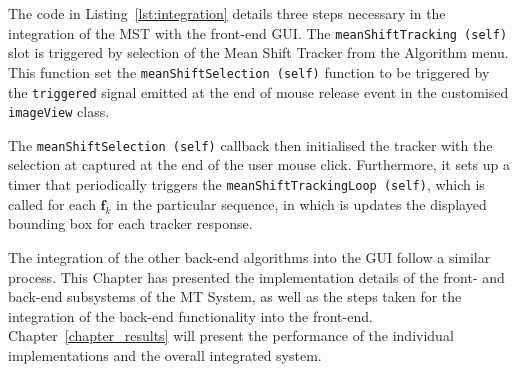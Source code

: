 The code in Listing~\ref{lst:integration} details three steps necessary in the
integration of the MST with the front-end GUI\@. The
\lstinline{meanShiftTracking (self)} slot is triggered by selection of the Mean
Shift Tracker from the Algorithm menu. This function set the
\lstinline{meanShiftSelection (self)} function to be triggered by the 
\lstinline{triggered} signal emitted at the end of mouse
release event in the customised \lstinline{imageView} class. 

The \lstinline{meanShiftSelection (self)} callback then initialised the tracker with
the selection at captured at the end of the user mouse click. Furthermore, it
sets up a timer that periodically triggers the
\lstinline{meanShiftTrackingLoop (self)}, which is called for each
$\mathbf{f}_k$ in the particular sequence, in which is updates the displayed
bounding box for each tracker response.

The integration of the other back-end algorithms into the GUI follow a similar
process.
This Chapter has presented the implementation details of the front- and back-end
subsystems of the MT System, as well as the steps taken for the integration of
the back-end functionality into the front-end.
Chapter~\ref{chapter_results} will present the performance of the individual
implementations and the overall integrated system.
